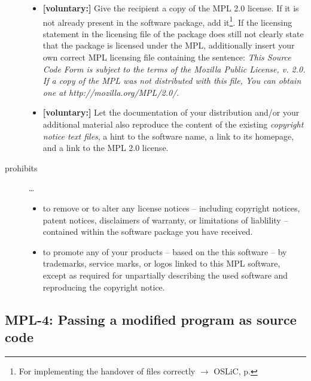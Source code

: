 \begin{description}
\begin{itemize}
  \item \textbf{[voluntary:]} Give the recipient a copy of the MPL 2.0 license.
  If it is not already present in the software package, add it\footnote{For
  implementing the handover of files correctly $\rightarrow$ OSLiC, p.
  \pageref{DistributingFilesHint}}. If the licensing statement in the licensing
  file of the package does still not clearly state that the package is licensed
  under the MPL, additionally insert your own correct MPL licensing file
  containing the sentence: \emph{This Source Code Form is subject to the terms
  of the Mozilla Public License, v. 2.0. If a copy of the MPL was not
  distributed with this file, You can obtain one at
  http://mozilla.org/MPL/2.0/}.
  
  \item \textbf{[voluntary:]} Let the documentation of your distribution and/or
  your additional material also reproduce the content of the existing
  \emph{copyright notice text files}, a hint to the software name, a link to its
  homepage, and a link to the MPL 2.0 license.
    
\end{itemize}

\item[prohibits] \ldots
\begin{itemize}
  \item to remove or to alter any license notices -- including copyright
  notices, patent notices, disclaimers of warranty, or limitations of liablility
  -- contained within the software package you have received.
  \item to promote any of your products -- based on the this software -- by
  trademarks, service marks, or logos linked to this MPL software, except as
  required for unpartially describing the used software and reproducing the
  copyright notice.
\end{itemize}

\end{description}

\subsection{MPL-4: Passing a modified program as source code}
\label{OSUC-04-MPL} 


